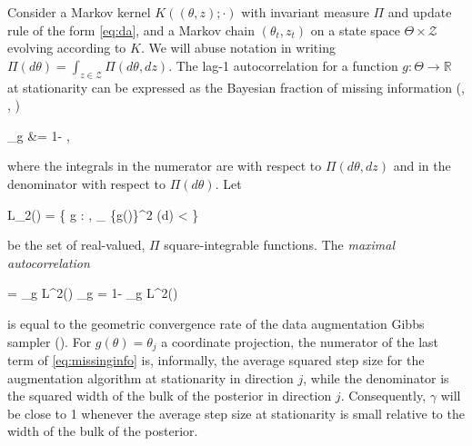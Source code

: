 \documentclass[12pt]{article}
\newcommand{\be}{\begin{equs}}
\newcommand{\ee}{\end{equs}}
\newcommand{\bb}[1]{\mathbb{#1}}
\newcommand{\mc}[1]{\mathcal{#1}}
\newcommand{\var}{\text{var}}
\begin{document}
Consider a Markov kernel $K((\theta,z);\cdot)$ with invariant measure $\Pi$ and update rule of the form \eqref{eq:da}, and a Markov chain $(\theta_t,z_t)$ on a state space $\Theta \times \mc Z$ evolving according to $K$. We will abuse notation in writing $\Pi(d\theta) = \int_{z \in \mc Z} \Pi(d\theta,dz)$. The lag-1 autocorrelation for a function $g : \Theta \to \bb R$ at stationarity can be expressed as the Bayesian fraction of missing information (\cite{papaspiliopoulos2007general}, \cite{rubin2004multiple}, \cite{liu1994fraction})
\be
\gamma_g &= 1- \frac{\bb E[\var(g(\theta) \mid z)]}{\var(g(\theta))}, \label{eq:missinginfo}
\ee
where the integrals in the numerator are with respect to $\Pi(d\theta,dz)$ and in the denominator with respect to $\Pi(d\theta)$. Let 
\be
L_2(\Pi) = \left\{ g : \Theta \to \bb R, \int_{\theta \in \Theta} \{g(\theta)\}^2 \Pi(d\theta) < \infty \right\} 
\ee
be the set of real-valued, $\Pi$ square-integrable functions. The \emph{maximal autocorrelation}
\be
\gamma = \sup_{g \in L^2(\Pi)} \gamma_g = 1- \inf_{g \in L^2(\Pi)} \frac{\bb E[\var(g(\theta) \mid z)]}{\var(g(\theta))}
\ee
is equal to the geometric convergence rate of the data augmentation Gibbs sampler (\cite{liu1994fraction}). For $g(\theta) = \theta_j$ a coordinate projection, the numerator of the last term of \eqref{eq:missinginfo} is, informally, the average squared step size for the augmentation algorithm at stationarity in direction $j$, while the denominator is the squared width of the bulk of the posterior in direction $j$. Consequently, $\gamma$ will be close to 1 whenever the average step size at stationarity is small relative to the width of the bulk of the posterior. 
\end{document}
